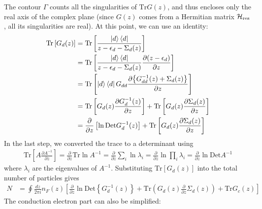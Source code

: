 \documentclass[12pt,twoside]{report}
\numberwithin{equation}{section}
\begin{document}
The contour \(\Gamma\) counts all the singularities of \(\text{Tr} G(z)\), and thus encloses only the real axis of the complex plane (since \(G(z)\) comes from a Hermitian matrix \(\mathcal{H}_\text{res}\), all its singularities are real).
At this point, we can use an identity:
\begin{equation}\begin{aligned}
	\text{Tr}\left[G_{d}(z)\right] &= \text{Tr}\left[ \frac{\ket{d}\bra{d}}{z - \epsilon_d - \Sigma_d(z)}\right]\\
				       &= \text{Tr}\left[ \frac{\ket{d}\bra{d}}{z - \epsilon_d - \Sigma_d(z)}\frac{\partial{\left(z - \epsilon_d\right)}}{\partial{z}} \right]\\
				       &= \text{Tr}\left[ \ket{d}\bra{d}G_{dd}\frac{\partial{\left\{G_{dd}^{-1}(z) + \Sigma_d(z)\right\}}}{\partial{z}} \right]\\
				       &= \text{Tr}\left[ G_{d}(z)\frac{\partial{G_{d}^{-1}(z)}}{\partial{z}} \right] + \text{Tr}\left[ G_{d}(z)\frac{\partial{\Sigma_d(z)}}{\partial{z}} \right]\\
				       &= \frac{\partial{}}{\partial{z}}\left[\ln \text{Det}G_{d}^{-1}(z)\right] + \text{Tr}\left[ G_{d}(z)\frac{\partial{\Sigma_d(z)}}{\partial{z}} \right]\\
\end{aligned}\end{equation}
In the last step, we converted the trace to a determinant using
\begin{equation}\begin{aligned}
	\text{Tr}\left[A \frac{\partial{A^{-1}}}{\partial{z}}\right] = \frac{\partial{}}{\partial{z}}\text{Tr}\ln A^{-1} =\frac{\partial{}}{\partial{z}}\sum_i \ln \lambda_i = \frac{\partial{}}{\partial{z}}\ln \prod_i \lambda_i = \frac{\partial{}}{\partial{z}}\ln \text{Det}A^{-1}
\end{aligned}\end{equation}
where \(\lambda_i\) are the eigenvalues of \(A^{-1}\). Substituting \(\text{Tr}\left[G_d(z)\right] \) into the total number of particles gives
\begin{equation}\begin{aligned}
	N  &= \oint \frac{dz}{2\pi i}n_F(z) \left[\frac{\partial{}}{\partial{z}} \ln \text{Det} \left\{G^{-1}_d(z)\right\} + \text{Tr} \left( G_d(z) \frac{\partial{}}{\partial{z}}\Sigma_d(z) \right) + \text{Tr}G_c(z)\right]
\end{aligned}\end{equation}
The conduction electron part can also be simplified:
\end{document}
